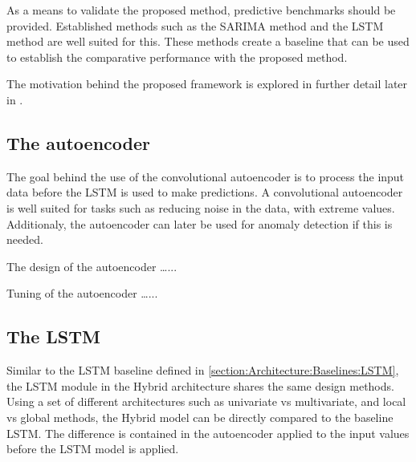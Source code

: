 As a means to validate the proposed method, predictive benchmarks should be provided.
Established methods such as the SARIMA method and the LSTM method are well suited for this.
These methods create a baseline that can be used to establish the comparative performance with the proposed method.

The motivation behind the proposed framework is explored in further detail later in .


\subsection{The autoencoder}
The goal behind the use of the convolutional autoencoder is to process the input data before the LSTM is used to make predictions.
A convolutional autoencoder is well suited for tasks such as reducing noise in the data, with extreme values.
Additionaly, the autoencoder can later be used for anomaly detection if this is needed.


The design of the autoencoder \dots ...


Tuning of the autoencoder \dots ...



\subsection{The LSTM}
Similar to the LSTM baseline defined in \cref{section:Architecture:Baselines:LSTM},
the LSTM module in the Hybrid architecture shares the same design methods.
Using a set of different architectures such as univariate vs multivariate, and local vs global methods,
the Hybrid model can be directly compared to the baseline LSTM.
The difference is contained in the autoencoder applied to the input values before the LSTM model is applied.

